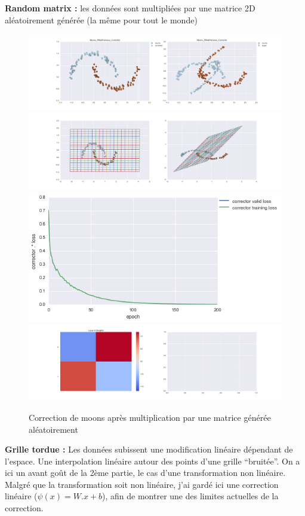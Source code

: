 {\Large \textbf{Random matrix :}} les données sont multipliées par une matrice 2D aléatoirement générée
 (la même pour tout le monde)

\begin{figure}[H] %
\centering
\includegraphics[width=\linewidth]{fig/24-05-2016/moons/Moons_RMatPairwise_Corrector-DATA.png}
\includegraphics[width=\linewidth]{fig/24-05-2016/moons/Moons_RMatPairwise_Corrector-GridCheck.png}
\includegraphics[width=0.45\linewidth]{fig/24-05-2016/moons/Moons_RMatPairwise_Corrector-Learning_curve.png}
\includegraphics[width=\linewidth]{fig/24-05-2016/moons/Moons_RMatPairwise_Corrector-W.png}
\caption{Correction de moons après multiplication par une matrice générée aléatoirement}
\label{fig:recap-moons-RMat-pairwise}
\end{figure}


{\Large \textbf{Grille tordue :}} Les données subissent une modification linéaire dépendant de l'espace.
Une interpolation linéaire autour des points d'une grille ``bruitée''.
On a ici un avant goût de la 2ème partie, le cas d'une transformation non linéaire.
Malgré que la transformation soit non linéaire, j'ai gardé ici une correction linéaire ($\psi(x) = W.x+b$),
afin de montrer une des limites actuelles de la correction.

